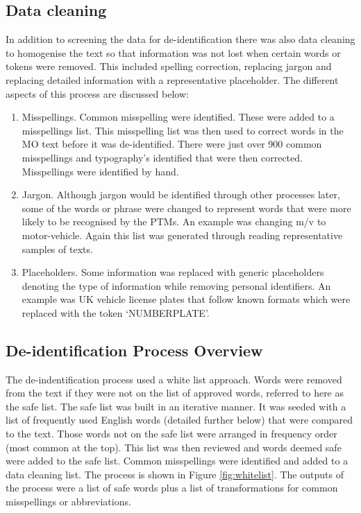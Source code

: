 \subsection{Data cleaning} In addition to screening the data for de-identification there was also data cleaning to homogenise the text so that information was not lost when certain words or tokens were removed. This included spelling correction, replacing jargon and replacing detailed information with a representative placeholder. The different aspects of this process are discussed below:

\begin{enumerate}
    \item{Misspellings.} Common misspelling were identified. These were added to a misspellings list. This misspelling list was then used to correct words in the MO text before it was de-identified. There were just over 900 common misspellings and typography's identified that were then corrected. Misspellings were identified by hand.
    
    \item{Jargon.} Although jargon would be identified through other processes later, some of the words or phrase were changed to represent words that were more likely to be recognised by the PTMs. An example was changing m/v to motor-vehicle. Again this list was generated through reading representative samples of texts.
    
    \item{Placeholders.} Some information was replaced with generic placeholders denoting the type of information while removing personal identifiers. An example was UK vehicle license plates that follow known formats which were replaced with the token ‘NUMBERPLATE’. 
\end{enumerate}


\subsection{De-identification Process Overview} The de-indentification process  used a white list approach. Words were removed from the text if they were not on the list of approved words, referred to here as the safe list. The safe list was built in an iterative manner.  It was seeded with  a list of  frequently used English words (detailed further below) that were compared to the text. Those words not on the safe list were arranged in frequency order (most common at the top). This list was then reviewed and words deemed safe were added to the safe list. Common misspellings were identified and added to a data cleaning list. The process is shown in Figure \ref{fig:whitelist}. The outputs of the process  were a list of safe words plus a list of transformations for common misspellings or abbreviations.



